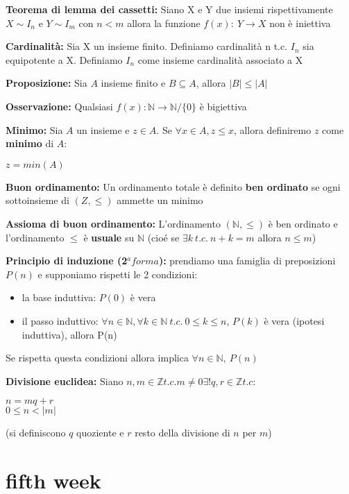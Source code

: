 \documentclass[11pt, letterpaper]{article}
\begin{document}
\textbf{Teorema di lemma dei cassetti:} Siano X e Y due insiemi rispettivamente $X\sim I_{n}$ e $Y\sim I_{m}$
con $n<m$ allora la funzione $f(x):\ Y\rightarrow X$ non è iniettiva

\textbf{Cardinalità:} Sia X un insieme finito. Definiamo cardinalità n t.c. $I_{n}$ sia equipotente
a X. Definiamo $I_{n}$ come insieme cardinalità associato a X

\textbf{Proposizione:} Sia $A$ insieme finito e $B\subseteq A$, allora $|B|\leq |A|$

\textbf{Osservazione:} Qualsiasi $f(x): \mathbb{N}\rightarrow\mathbb{N}/\{0\} $ è bigiettiva

\textbf{Minimo:} Sia $A$ un insieme e $z\in A$. Se $\forall x \in A, z\leq x$, allora definiremo $z$ come 
\textbf{minimo} di $A$: 
\begin{center}
    $z = min(A)$
\end{center}

\textbf{Buon ordinamento:} Un ordinamento totale è definito \textbf{ben ordinato} se ogni sottoinsieme di 
$(Z,\leq)$ ammette un minimo

\textbf{Assioma di buon ordinamento:} L'ordinamento $(\mathbb{N},\leq)$ è ben ordinato e l'ordinamento $\leq$
è \textbf{usuale} su $\mathbb{N}$ (cioé se $\exists k\ t.c.\ n+k=m$ allora $n\leq m$)

\textbf{Principio di induzione (2$^{a} forma$):} prendiamo una famiglia di preposizioni $P(n)$ e supponiamo
rispetti le 2 condizioni:
\begin{itemize}
    \item la base induttiva: $P(0)$ è vera
    \item il passo induttivo: $\forall n\in\mathbb{N}, \forall k \in\mathbb{N}\ t.c.\ 0\leq k \leq n$,
    $P(k)$ è vera (ipotesi induttiva), allora P(n)
\end{itemize}
Se rispetta questa condizioni allora implica $\forall n\in\mathbb{N},\ P(n)$

\newpage
\textbf{Divisione euclidea:} Siano $n,m\in\mathbb{Z} t.c. m\neq 0 \exists ! q,r\in\mathbb{Z} t.c:$
\begin{center}
    $n=mq+r$\\$0\leq n <|m|$
\end{center}
(si definiscono $q$ quoziente e $r$ resto della divisione di $n$ per $m$)

\newpage
\section{fifth week}
\end{document}
